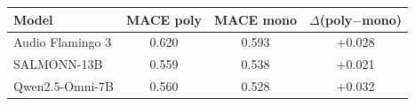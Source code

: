 \begin{tabular}{lccc}
\toprule
Model & MACE poly & MACE mono & $\Delta$(poly$-$mono) \\
\midrule
Audio Flamingo 3 & 0.620 & 0.593 & +0.028 \\
SALMONN-13B & 0.559 & 0.538 & +0.021 \\
Qwen2.5-Omni-7B & 0.560 & 0.528 & +0.032 \\
\bottomrule
\end{tabular}
